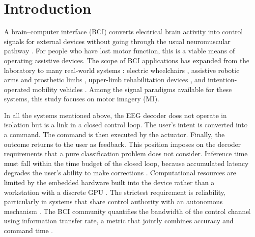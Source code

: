 
\section{Introduction}
\label{sec:gioithieu}

A brain--computer interface (BCI) converts electrical brain activity
into control signals for external devices without going through the
usual neuromuscular pathway \cite{chen2025brain, tonin2021noninvasive,
ding2026brain}. For people who have lost motor function, this is a
viable means of operating assistive devices. The scope of BCI
applications has expanded from the laboratory to many real-world
systems \cite{varbu2022present, pang2024applications}: electric
wheelchairs \cite{palumbo2021motorimagery, lei2022intention,
mai2024hybrid}, assistive robotic arms and prosthetic limbs
\cite{casey2021bci}, upper-limb rehabilitation devices
\cite{baniqued2021brain}, and intention-operated mobility vehicles
\cite{lu2020model}. Among the signal paradigms available for these
systems, this study focuses on motor imagery (MI).

In all the systems mentioned above, the EEG decoder does not operate
in isolation but is a link in a closed control loop. The user's
intent is converted into a command. The command is then executed by
the actuator. Finally, the outcome returns to the user as feedback.
This position imposes on the decoder requirements that a pure
classification problem does not consider. Inference time must fall
within the time budget of the closed loop, because accumulated
latency degrades the user's ability to make corrections
\cite{an2024development, tonin2020role}. Computational resources are
limited by the embedded hardware built into the device rather than a
workstation with a discrete GPU \cite{wang2024mibminet,
sun2025signal, craighero2024ondevice}. The strictest requirement is
reliability, particularly in systems that share control authority
with an autonomous mechanism \cite{choi2023asynchronous,
deng2020selfadaptive}. The BCI community quantifies the bandwidth of
the control channel using information transfer rate, a metric that
jointly combines accuracy and command time \cite{wolpaw2002brain}.

